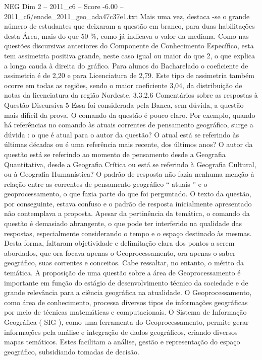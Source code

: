 \begin{textsample}{NEG Dim 2 – 2011\_c6 – Score -6.00 – 2011\_c6/enade\_2011\_geo\_ada47c37e1.txt}
Mais uma vez, destaca -se o grande número de estudantes que deixaram a questão em branco, para duas habilitações desta Área, mais do que 50 \%, como já indicava o valor da mediana.
Como nas questões discursivas anteriores do Componente de Conhecimento Específico, esta tem assimetria positiva grande, neste caso igual ou maior do que 2, o que explica a longa cauda à direita do gráfico.
Para alunos do Bacharelado o coeficiente de assimetria é de 2,20 e para Licenciatura de 2,79.
Este tipo de assimetria também ocorre em todas as regiões, sendo o maior coeficiente 3,04, da distribuição de notas da licenciatura da região Nordeste. 3.3.2.6 Comentários sobre as respostas à Questão Discursiva 5 Essa foi considerada pela Banca, sem dúvida, a questão mais difícil da prova.
O comando da questão é pouco claro.
Por exemplo, quando há referências no comando às atuais correntes de pensamento geográfico, surge a dúvida : o que é atual para o autor da questão?
O atual está se referindo às últimas décadas ou é uma referência mais recente, dos últimos anos?
O autor da questão está se referindo ao momento de pensamento desde a Geografia Quantitativa, desde a Geografia Crítica ou está se referindo à Geografia Cultural, ou à Geografia Humanística?
O padrão de resposta não fazia nenhuma menção à relação entre as correntes de pensamento geográfico “ atuais ” e o geoprocessamento, o que fazia parte do que foi perguntado.
O texto da questão, por conseguinte, estava confuso e o padrão de resposta inicialmente apresentado não contemplava a proposta.
Apesar da pertinência da temática, o comando da questão é demasiado abrangente, o que pode ter interferido na qualidade das respostas, especialmente considerando o tempo e o espaço destinado às mesmas.
Desta forma, faltaram objetividade e delimitação clara dos pontos a serem abordados, que ora focava apenas o Geoprocessamento, ora apenas o saber geográfico, suas correntes e conceitos.
Cabe ressaltar, no entanto, o mérito da temática.
A proposição de uma questão sobre a área de Geoprocessamento é importante em função do estágio de desenvolvimento técnico da sociedade e de grande relevância para a ciência geográfica na atualidade.
O Geoprocessamento, como área de conhecimento, processa diversos tipos de informações geográficas por meio de técnicas matemáticas e computacionais.
O Sistema de Informação Geográfica ( SIG ), como uma ferramenta do Geoprocessamento, permite gerar informações pela análise e integração de dados geográficos, criando diversos mapas temáticos.
Estes facilitam a análise, gestão e representação do espaço geográfico, subsidiando tomadas de decisão.

\end{textsample}

